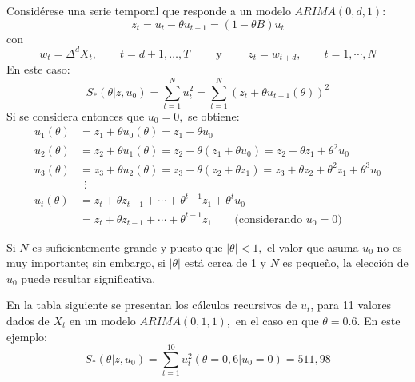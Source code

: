 \begin{ejemplo}
Consid\'{e}rese una serie temporal que responde a un modelo $ARIMA (0,d,1)$:
\[
 z_{t} =u_{t} -\theta u_{t-1} =\left( {1-\theta B} \right)u_{t}
\]
con
\[
w_{t} =\Delta^{d} X_{t}, \qquad t=d+1,\ldots, T \qquad \text{ y }\qquad z_{t} =w_{t+d} ,\qquad t=1, \cdots , N
\]
En este caso:
\[
S_{\ast } \left( {\theta \left| {z,u_{0} } \right.} \right)=\sum_{t=1}^N {u_{t}^{2} =\sum_{t=1}^N {\left( {z_{t} +\theta u_{t-1} \left( \theta \right)} \right)^{2}} } 
\]
Si se considera entonces que $u_{0} =0,$ se obtiene:
\begin{align*}
 u_{1} \left( \theta \right)&=z_{1} +\theta u_{0} \left( \theta \right)=z_{1} +\theta u_{0} \\ 
 u_{2} \left( \theta \right)&=z_{2} +\theta u_{1} \left( \theta \right)=z_{2} +\theta \left( {z_{1} +\theta u_{0} } \right)=z_{2} +\theta z_{1} +\theta^{2}u_{0} \\ 
 u_{3} \left( \theta \right)&=z_{3} +\theta u_{2} \left( \theta \right)=z_{3} +\theta \left( {z_{2} +\theta z_{1} } \right)=z_{3} +\theta z_{2} +\theta^{2}z_{1} +\theta^{3}u_{0} \\ 
 &\ \ \vdots \\ 
 u_{t} \left( \theta \right)&=z_{t} +\theta z_{t-1} +\cdots +\theta ^{t-1}z_{1} +\theta^{t}u_{0} \\ 
 &=z_{t} +\theta z_{t-1} +\cdots +\theta^{t-1}z_{1} \qquad \text{(considerando $u_{0} =0$)}
\end{align*}


Si $N$ es suficientemente grande y puesto que $\left| \theta \right|<1,$ el valor que asuma $u_{0} $ no es muy importante; sin embargo, si $\left| \theta \right|$ est\'{a} cerca de 1 y $N$ es peque\~{n}o, la elecci\'{o}n de $u_{0} $ puede resultar significativa.\newline

En la tabla siguiente se presentan los c\'{a}lculos recursivos de $u_{t}$, para 11 valores dados de $X_{t} $ en un modelo $ARIMA\left( {0,1,1} \right),$ en el caso en que $\theta=0.6$. En este ejemplo:
\[
S_{\ast } \left( {\theta \left| {z,u_{0} } \right.} \right)=\sum_{t=1}^{10} {u_{t}^{2} \left( {\theta =0,6\left| {u_{0} =0} \right.} \right)=511,98} 
\]


\end{ejemplo}
